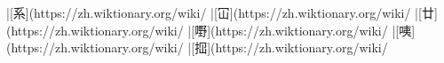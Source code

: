 |[系](https://zh.wiktionary.org/wiki/%
|[冚](https://zh.wiktionary.org/wiki/%
|[廿](https://zh.wiktionary.org/wiki/%
|[嘢](https://zh.wiktionary.org/wiki/%
|[咦](https://zh.wiktionary.org/wiki/%
|[𢫏](https://zh.wiktionary.org/wiki/%
